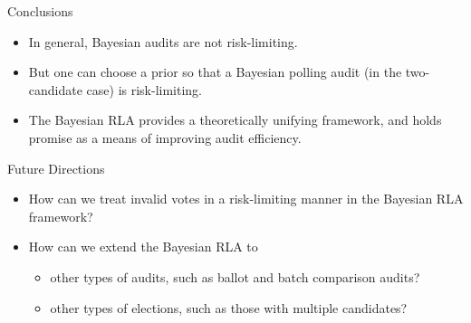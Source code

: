 \documentclass{beamer}
\begin{document}
\begin{frame}{Conclusions}
\begin{itemize}
    \item In general, Bayesian audits are not risk-limiting.
    \vskip 1cm
    \item But one can choose a prior so that a Bayesian polling audit (in the two-candidate case) is risk-limiting.
    \vskip 1cm
    \item The Bayesian RLA provides a theoretically unifying framework, and holds promise as a means of improving audit efficiency.
\end{itemize}
\end{frame}

\begin{frame}{Future Directions}
\begin{itemize}
    \item How can we treat invalid votes in a risk-limiting manner in the Bayesian RLA framework?
    \vskip 1cm
    \item How can we extend the Bayesian RLA to
    \begin{itemize}
        \item other types of audits, such as ballot and batch comparison audits?
        \item other types of elections, such as those with multiple candidates?
    \end{itemize}
\end{itemize}
\end{frame}
\end{document}
